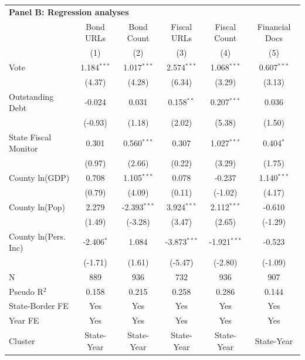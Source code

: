 \begingroup
\centering
\begin{tabular*}{\textwidth}{@{\extracolsep{\fill}}lccccc}
\multicolumn{5}{l}{\textbf{Panel B: Regression analyses}}\\

\addlinespace
   \toprule
                        & Bond URLs     & Bond Count     & Fiscal URLs    & Fiscal Count   & Financial Docs\\  
                        & (1)           & (2)            & (3)            & (4)            & (5)\\  
   \midrule 
   Vote                 & 1.184$^{***}$ & 1.017$^{***}$  & 2.574$^{***}$  & 1.068$^{***}$  & 0.607$^{***}$\\   
                        & (4.37)       & (4.28)        & (6.34)        & (3.29)        & (3.13)\\   
   Outstanding Debt     & -0.024        & 0.031          & 0.158$^{**}$   & 0.207$^{***}$  & 0.036\\   
                        & (-0.93)      & (1.18)        & (2.02)        & (5.38)        & (1.50)\\   
   State Fiscal Monitor & 0.301         & 0.560$^{***}$  & 0.307          & 1.027$^{***}$  & 0.404$^{*}$\\   
                        & (0.97)       & (2.66)        & (0.22)        & (3.29)        & (1.75)\\   
   County ln(GDP)       & 0.708         & 1.105$^{***}$  & 0.078          & -0.237         & 1.140$^{***}$\\   
                        & (0.79)       & (4.09)        & (0.11)        & (-1.02)       & (4.17)\\   
   County ln(Pop)       & 2.279         & -2.393$^{***}$ & 3.924$^{***}$  & 2.112$^{***}$  & -0.610\\   
                        & (1.49)       & (-3.28)       & (3.47)        & (2.65)        & (-1.29)\\   
   County ln(Pers. Inc) & -2.406$^{*}$  & 1.084          & -3.873$^{***}$ & -1.921$^{***}$ & -0.523\\   
                        & (-1.71)      & (1.61)        & (-5.47)       & (-2.80)       & (-1.09)\\   
   \hline
   N         & 889           & 936            & 732            & 936            & 907\\  
   Pseudo R$^2$         & 0.158         & 0.215          & 0.258          & 0.286          & 0.144\\  
   State-Border FE      & Yes           & Yes            & Yes            & Yes            & Yes\\  
   Year FE              & Yes           & Yes            & Yes            & Yes            & Yes\\  
   Cluster              & State-Year & State-Year & State-Year & State-Year & State-Year\\  
   \bottomrule
\end{tabular*}
\par\endgroup
